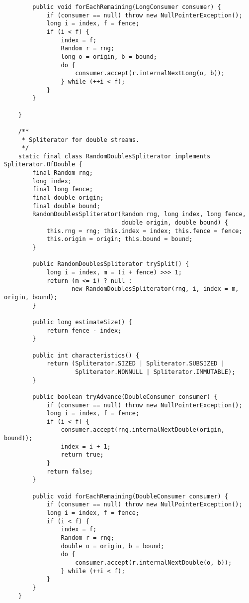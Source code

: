 \documentclass[12pt,a4paper,twoside,openright,titlepage,final]{article}
\begin{document}
\begin{verbatim}
        public void forEachRemaining(LongConsumer consumer) {
            if (consumer == null) throw new NullPointerException();
            long i = index, f = fence;
            if (i < f) {
                index = f;
                Random r = rng;
                long o = origin, b = bound;
                do {
                    consumer.accept(r.internalNextLong(o, b));
                } while (++i < f);
            }
        }

    }

    /**
     * Spliterator for double streams.
     */
    static final class RandomDoublesSpliterator implements Spliterator.OfDouble {
        final Random rng;
        long index;
        final long fence;
        final double origin;
        final double bound;
        RandomDoublesSpliterator(Random rng, long index, long fence,
                                 double origin, double bound) {
            this.rng = rng; this.index = index; this.fence = fence;
            this.origin = origin; this.bound = bound;
        }

        public RandomDoublesSpliterator trySplit() {
            long i = index, m = (i + fence) >>> 1;
            return (m <= i) ? null :
                   new RandomDoublesSpliterator(rng, i, index = m, origin, bound);
        }

        public long estimateSize() {
            return fence - index;
        }

        public int characteristics() {
            return (Spliterator.SIZED | Spliterator.SUBSIZED |
                    Spliterator.NONNULL | Spliterator.IMMUTABLE);
        }

        public boolean tryAdvance(DoubleConsumer consumer) {
            if (consumer == null) throw new NullPointerException();
            long i = index, f = fence;
            if (i < f) {
                consumer.accept(rng.internalNextDouble(origin, bound));
                index = i + 1;
                return true;
            }
            return false;
        }

        public void forEachRemaining(DoubleConsumer consumer) {
            if (consumer == null) throw new NullPointerException();
            long i = index, f = fence;
            if (i < f) {
                index = f;
                Random r = rng;
                double o = origin, b = bound;
                do {
                    consumer.accept(r.internalNextDouble(o, b));
                } while (++i < f);
            }
        }
    }


\end{verbatim}
\end{document}
